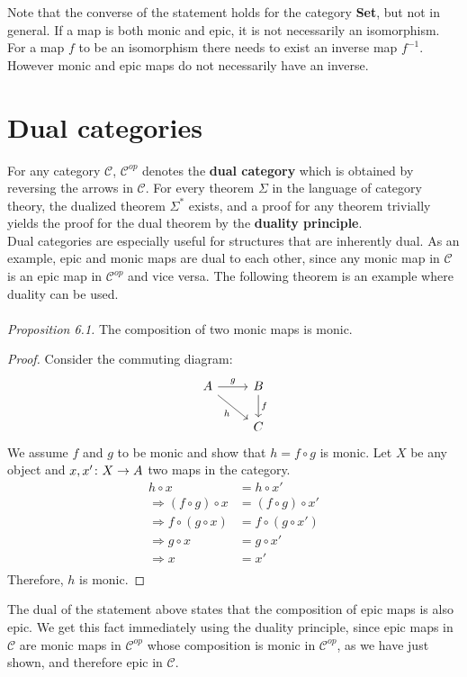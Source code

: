 Note that the converse of the statement holds for the category \textbf{Set}, but not in general.
If a map is both monic and epic, it is not necessarily an isomorphism.
For a map $f$ to be an isomorphism there needs to exist an inverse map $f^{-1}$.
However monic and epic maps do not necessarily have an inverse.\\

\section {Dual categories}

For any category $\mathscr{C}$, $\mathscr{C}^{op}$ denotes the \textbf{dual category}
which is obtained by reversing the arrows in $\mathscr{C}$.
For every theorem $\Sigma$ in the language of category theory,
the dualized theorem $\Sigma^*$ exists,
and a proof for any theorem trivially yields the proof for the dual theorem by the \textbf{duality principle}.\\
Dual categories are especially useful for structures that are inherently dual.
As an example, epic and monic maps are dual to each other, since any monic map in $\mathscr{C}$
is an epic map in $\mathscr{C}^{op}$ and vice versa.
The following theorem is an example where duality can be used.\\\\
\textit{Proposition 6.1.} The composition of two monic maps is monic.
\begin{proof}
  Consider the commuting diagram:
  \[
    \begin{tikzcd}
      A \arrow[dr, swap, "h"] \arrow{r}{g} & B \arrow{d}{f} \\
      & C
    \end{tikzcd}
  \]
  We assume $f$ and $g$ to be monic and show that $h = f \circ g $ is monic.
  Let $X$ be any object and $x, x' \from X \to A$ two maps in the category.
  \begin{align*}
    h \circ x &= h \circ x' \\
   \Rightarrow (f \circ g) \circ x &= (f \circ g) \circ x' \\
    \Rightarrow f \circ (g \circ x) &= f \circ (g \circ x') \\
    \Rightarrow g \circ x &= g \circ x' \\
    \Rightarrow x &= x' \\
  \end{align*}
  Therefore, $h$ is monic.
\end{proof}
The dual of the statement above states that the composition of epic maps is also epic.
We get this fact immediately using the duality principle, since epic maps in $\mathscr{C}$
are monic maps in $\mathscr{C}^{op}$ whose composition is monic in $\mathscr{C}^{op}$, as we
have just shown, and therefore epic in $\mathscr{C}$.

